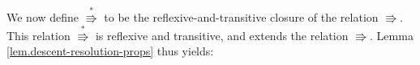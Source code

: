 \documentclass[numbers=enddot,12pt,final,onecolumn,notitlepage]{scrartcl}%
\theoremstyle{definition}
\newenvironment{proof}[1][Proof]{\noindent\textbf{#1.} }{\ \rule{0.5em}{0.5em}}
\def\BenignTables{{\operatorname{BT}^{12}\left(  \lambda/\mu\right)}}
\begin{document}





We now define $\overset{\ast}{\Rrightarrow}$ to be the
reflexive-and-transitive closure of the relation $\Rrightarrow$.
This relation $\overset{\ast}{\Rrightarrow}$ is reflexive and transitive,
and extends the relation $\Rrightarrow$.
Lemma \ref{lem.descent-resolution-props} thus yields:
\end{document}
